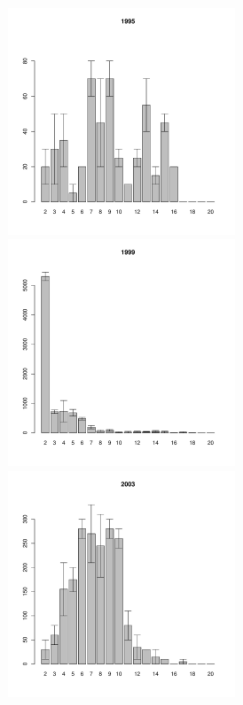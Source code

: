 \documentclass[12pt, a4paper]{article}
\begin{document}
\begin{figure}[h]
\begin{multicols}{3}
\hfill
\includegraphics[width=60mm]{../White_Sea/Ryashkov_ZRS/zrs2_1995_.pdf}
\hfill
\includegraphics[width=60mm]{../White_Sea/Ryashkov_ZRS/zrs2_1999_.pdf}
\hfill
\includegraphics[width=60mm]{../White_Sea/Ryashkov_ZRS/zrs2_2003_.pdf}
\end{multicols}



\end{figure}
\end{document}
